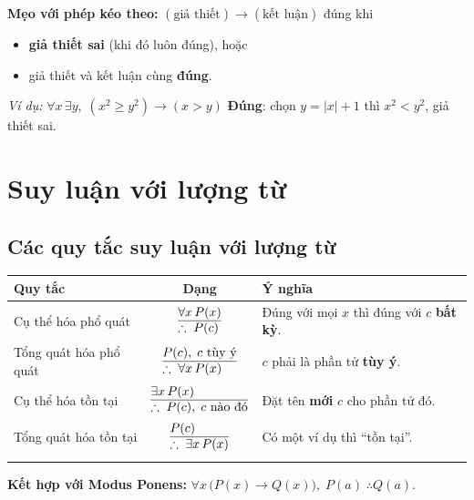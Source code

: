 \documentclass[12pt,a4paper]{article}
\makeatletter
\newcommand{\suyluan}[2]{%
  \begin{array}{@{}l@{}}
    #1 \\ \hline
    \therefore\; #2
  \end{array}%
}
\makeatother
\begin{document}
\textbf{Mẹo với phép kéo theo:} $(\text{giả thiết}) \to (\text{kết luận})$ đúng khi
\begin{itemize}
  \item \textbf{giả thiết sai} (khi đó luôn đúng), hoặc
  \item giả thiết và kết luận cùng \textbf{đúng}.
\end{itemize}
\textit{Ví dụ:} $\forall x\,\exists y,\; (x^2 \ge y^2) \to (x > y)$ \textbf{Đúng}: chọn $y = |x| + 1$ thì $x^2 < y^2$, giả thiết sai.

\section{Suy luận với lượng từ}

\subsection{Các quy tắc suy luận với lượng từ}

\begin{center}
\renewcommand{\arraystretch}{1.4}
\begin{tabular}{lcl}
\toprule
\textbf{Quy tắc} & \textbf{Dạng} & \textbf{Ý nghĩa} \\
\midrule
\addlinespace[4pt]
Cụ thể hóa phổ quát & $\suyluan{\forall x\, P(x)}{P(c)}$ & Đúng với mọi $x$ thì đúng với $c$ \textbf{bất kỳ}. \\
\addlinespace[8pt]
Tổng quát hóa phổ quát & $\suyluan{P(c),\; c \text{ tùy ý}}{\forall x\, P(x)}$ & $c$ phải là phần tử \textbf{tùy ý}. \\
\addlinespace[8pt]
Cụ thể hóa tồn tại & $\suyluan{\exists x\, P(x)}{P(c),\; c \text{ nào đó}}$ & Đặt tên \textbf{mới} $c$ cho phần tử đó. \\
\addlinespace[8pt]
Tổng quát hóa tồn tại & $\suyluan{P(c)}{\exists x\, P(x)}$ & Có một ví dụ thì ``tồn tại''. \\
\addlinespace[4pt]
\bottomrule
\end{tabular}
\end{center}

\textbf{Kết hợp với Modus Ponens:} $\forall x\,\big(P(x) \to Q(x)\big),\; P(a)\; \therefore Q(a)$.
\end{document}
